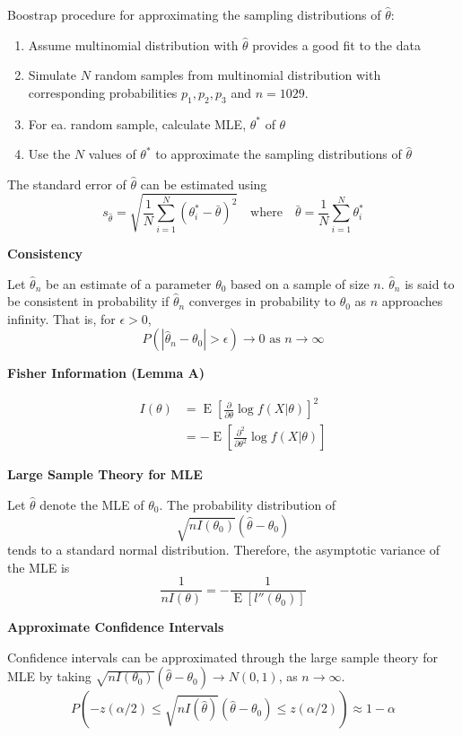 \documentclass[a4paper]{article}
\newcommand{\subheading}[1]{{\scriptsize\textbf{#1}}}
\newcommand{\expectation}[1]{\operatorname{E}[#1]}
\begin{document}
\begin{multicols*}{4}
Boostrap procedure for approximating the sampling distributions of $\hat{\theta}$:
\smallskip
\begin{enumerate}
    \item Assume multinomial distribution with $\hat{\theta}$ provides a good fit to the data
    \item Simulate $N$ random samples from multinomial distribution with corresponding probabilities $p_1,p_2,p_3$ and $n = 1029$.
    \item For ea. random sample, calculate MLE, $\theta^*$ of $\theta$
    \item Use the $N$ values of $\theta^*$ to approximate the sampling distributions of $\hat{\theta}$
\end{enumerate}
\smallskip
The standard error of $\hat{\theta}$ can be estimated using
$$
s_{\hat{\theta}} = \sqrt{\frac{1}{N}\sum_{i=1}^N (\theta^*_i - \bar{\theta})^2} \quad \text{where} \quad \bar{\theta} = \frac{1}{N}\sum_{i=1}^N \theta^*_i
$$

\subheading{Consistency}

  Let $\hat{\theta}_n$ be an estimate of a parameter $\theta_0$ based on a
  sample of size $n$. $\hat{\theta}_n$ is said to be consistent in probability if
  $\hat{\theta}_n$ converges in probability to $\theta_0$ as $n$ approaches
  infinity. That is, for $\epsilon > 0$,
  $$P(|\hat{\theta}_n - \theta_0| > \epsilon) \rightarrow 0 \text{ as } n
  \rightarrow \infty$$
  
\subheading{Fisher Information (Lemma A)}

  \begin{align*}
    I(\theta) &= \operatorname{E} \left [
      \frac{\partial}{\partial\theta} \log f(X|\theta)
    \right ]^2 \\
      &= - \operatorname{E} \left [
        \frac{\partial^2}{\partial\theta^2} \log f(X|\theta)
    \right ]
  \end{align*}

\subheading{Large Sample Theory for MLE}

  Let $\hat{\theta}$ denote the MLE of $\theta_0$. The probability distribution
  of
  $$\sqrt{nI(\theta_0)}(\hat{\theta} - \theta_0)$$
  tends to a standard normal distribution. Therefore, the asymptotic variance of
  the MLE is
  $$\frac{1}{nI(\theta)} = - \frac{1}{\expectation{l''(\theta_0)}}$$

\subheading{Approximate Confidence Intervals}

Confidence intervals can be approximated through the large sample theory for
  MLE by taking $\sqrt{nI(\theta_0)}(\hat{\theta}-\theta_0) \rightarrow N(0,
  1)$, as $n \rightarrow \infty$. \smallskip
  $$P \left (
    -z(\alpha/2) \leq
    \sqrt{nI(\hat{\theta})}(\hat{\theta} - \theta_0) \leq
    z(\alpha/2)
  \right ) \approx 1 - \alpha$$


\end{multicols*}
\end{document}
